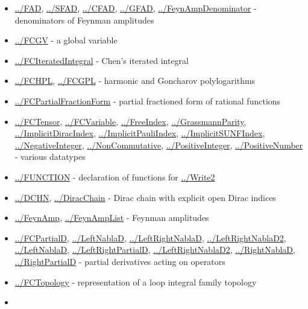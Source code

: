 \documentclass[../FeynCalcManual.tex]{subfiles}
\begin{document}
\begin{itemize}
\item
  \hyperlink{../fad}{../FAD}, \hyperlink{../sfad}{../SFAD},
  \hyperlink{../cfad}{../CFAD}, \hyperlink{../gfad}{../GFAD},
  \hyperlink{../feynampdenominator}{../FeynAmpDenominator} -
  denominators of Feynman amplitudes
\item
  \hyperlink{../fcgv}{../FCGV} - a global variable
\item
  \hyperlink{../fciteratedintegral}{../FCIteratedIntegral} - Chen's
  iterated integral
\item
  \hyperlink{../fchpl}{../FCHPL}, \hyperlink{../fcgpl}{../FCGPL} -
  harmonic and Goncharov polylogarithms
\item
  \hyperlink{../fcpartialfractionform}{../FCPartialFractionForm} -
  partial fractioned form of rational functions
\item
  \hyperlink{../fctensor}{../FCTensor},
  \hyperlink{../fcvariable}{../FCVariable},
  \hyperlink{../freeindex}{../FreeIndex},
  \hyperlink{../grassmannparity}{../GrassmannParity},
  \hyperlink{../implicitdiracindex}{../ImplicitDiracIndex},
  \hyperlink{../implicitpauliindex}{../ImplicitPauliIndex},
  \hyperlink{../implicitsunfindex}{../ImplicitSUNFIndex},
  \hyperlink{../negativeinteger}{../NegativeInteger},
  \hyperlink{../noncommutative}{../NonCommutative},
  \hyperlink{../positiveinteger}{../PositiveInteger},
  \hyperlink{../positivenumber}{../PositiveNumber} - various datatypes
\item
  \hyperlink{../function}{../FUNCTION} - declaration of functions for
  \hyperlink{../write2}{../Write2}
\item
  \hyperlink{../dchn}{../DCHN}, \hyperlink{../diracchain}{../DiracChain}
  - Dirac chain with explicit open Dirac indices
\item
  \hyperlink{../feynamp}{../FeynAmp},
  \hyperlink{../feynamplist}{../FeynAmpList} - Feynman amplitudes
\item
  \hyperlink{../fcpartiald}{../FCPartialD},
  \hyperlink{../leftnablad}{../LeftNablaD},
  \hyperlink{../leftrightnablad}{../LeftRightNablaD},
  \hyperlink{../leftrightnablad2}{../LeftRightNablaD2},
  \hyperlink{../leftnablad}{../LeftNablaD},
  \hyperlink{../leftrightpartiald}{../LeftRightPartialD},
  \hyperlink{../leftrightnablad2}{../LeftRightNablaD2},
  \hyperlink{../rightnablad}{../RightNablaD},
  \hyperlink{../rightpartiald}{../RightPartialD} - partial derivatives
  acting on operators
\item
  \hyperlink{../fctopology}{../FCTopology} - representation of a loop
  integral family topology
\item

\end{itemize}
\end{document}

